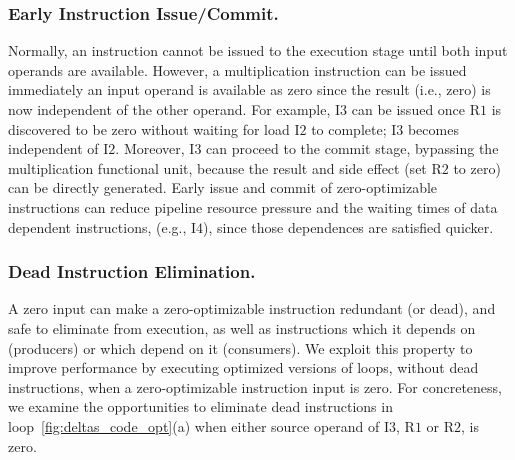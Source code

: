 \subsubsection{Early Instruction Issue/Commit.}  Normally, an instruction cannot be issued to the execution stage until both input operands are available. However, a multiplication instruction can be issued immediately an input operand is available as zero since the result (i.e., zero) is now independent of the other operand.  For example, I$3$ can be issued once R$1$ is discovered to be zero without waiting for load I$2$ to complete; I$3$ becomes independent of I$2$.  Moreover, I$3$ can proceed to the commit stage, bypassing the multiplication functional unit, because the result and side effect (set R$2$ to zero)  can be directly generated.  Early issue and commit of zero-optimizable instructions can reduce pipeline resource pressure and the waiting times of data dependent instructions, (e.g., I$4$), since those dependences are satisfied quicker. 

\subsubsection{Dead Instruction Elimination.} A zero input can make a zero-optimizable instruction redundant (or dead), and safe to eliminate from execution, as well as instructions which it depends on (producers) or which depend on it (consumers).  We exploit this property to improve performance by executing optimized versions of loops, without dead instructions, when a zero-optimizable instruction input is zero.  For concreteness, we examine the opportunities to eliminate dead instructions in loop~\ref{fig:deltas_code_opt}(a) when either source operand of I$3$, R$1$ or R$2$, is zero.  

